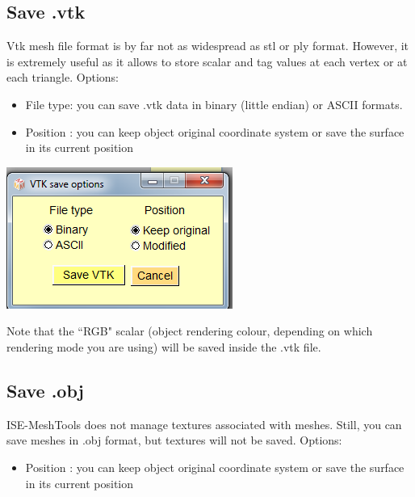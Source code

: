 \subsection{Save .vtk}
\begin{minipage}{0.5\textwidth}
Vtk mesh file format is by far not as widespread as stl or ply
format. However, it is extremely useful as it allows to store
scalar and tag values at each vertex or at each triangle.
Options:
\begin{itemize}
\item File type: you can save .vtk data in binary (little endian) or
ASCII formats.

\item Position : you can keep object original coordinate system
or save the surface in its current position
\end{itemize}
\end{minipage}    
\begin{minipage}{0.4\textwidth}\centering
  \includegraphics[scale=0.5]{images/File/Save_vtk.png}
 \end{minipage} 



Note that the ``RGB" scalar (object rendering colour, depending on which rendering mode you are
using) will be saved inside the .vtk file.

\subsection{Save .obj}

\begin{minipage}{0.5\textwidth}

ISE-MeshTools does not manage textures associated with
meshes. Still, you can save meshes in .obj format, but
textures will not be saved.
Options:
\begin{itemize}

\item Position : you can keep object original coordinate system
or save the surface in its current position
\end{itemize}
\end{minipage}    

